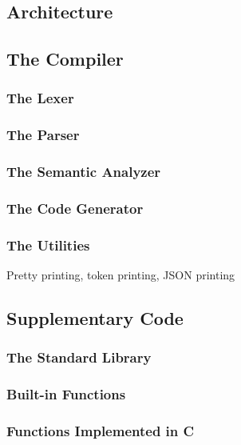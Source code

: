 \begin{homeworkProblem}
	\chapter{Architecture}
	\section{The Compiler}
	\subsection{The Lexer}
	
	\subsection{The Parser}
	\subsection{The Semantic Analyzer}
	\subsection{The Code Generator}
	\subsection{The Utilities}
	Pretty printing, token printing, JSON printing
	\section{Supplementary Code}
	\subsection{The Standard Library}
	\subsection{Built-in Functions}
	\subsection{Functions Implemented in C}
\end{homeworkProblem}